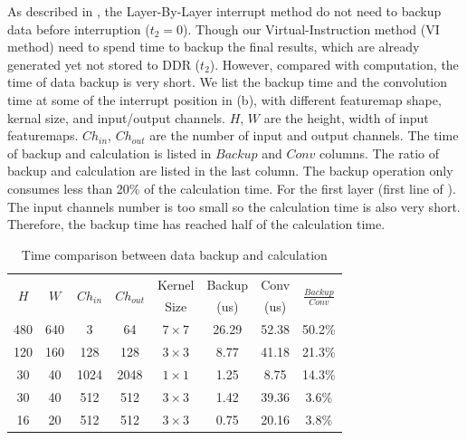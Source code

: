 As described in , the Layer-By-Layer interrupt method do not need to backup data before interruption ($t_2 = 0$). Though our Virtual-Instruction method (VI method) need to spend time to backup the final results, which are already generated yet not stored to DDR ($t_2$). However, compared with computation, the time of data backup is very short. We list the backup time and the convolution time at some of the interrupt position in (b), with different featuremap shape, kernal size, and input/output channels. $H$, $W$ are the height, width of input featuremaps. $Ch_{in}$, $Ch_{out}$ are the number of input and output channels. The time of backup and calculation is listed in $Backup$ and $Conv$ columns. The ratio of backup and calculation are listed in the last column. The backup operation only consumes less than 20\% of the calculation time. For the first layer (first line of ). The input channels number is too small so the calculation time is also very short. Therefore, the backup time has reached half of the calculation time. 

\begin{table}[t]
  \centering
  \caption{Time comparison between data backup and calculation}
    \begin{tabular}{|c|c|c|c|c|c|c|c|}
    \hline
    \multirow{2}[2]{*}{$H$} & \multirow{2}[2]{*}{$W$} & \multirow{2}[2]{*}{$Ch_{in}$} & \multirow{2}[2]{*}{$Ch_{out}$} & Kernel & Backup & Conv  & \multirow{2}[2]{*}{$\frac{Backup}{Conv}$} \bigstrut[t]\\
          &       &       &       & Size  & (us)  & (us)  &  \\
    \hline
    480   & 640   & 3     & 64    & $7 \times 7$ & 26.29  & 52.38  & 50.2\% \\
    \hline
    120   & 160   & 128   & 128   & $3 \times 3$ & 8.77  & 41.18  & 21.3\% \\
    \hline
    30    & 40    & 1024  & 2048  & $1 \times 1$ & 1.25  & 8.75  & 14.3\% \\
    \hline
    30    & 40    & 512   & 512   & $3 \times 3$ & 1.42  & 39.36  & 3.6\% \\
    \hline
    16    & 20    & 512   & 512   & $3 \times 3$ & 0.75  & 20.16  & 3.8\% \\
    \hline
    \end{tabular}%
  \label{tab:timecompare}%
\end{table}%




